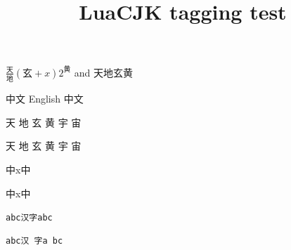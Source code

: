 \documentclass{article}
\title{LuaCJK tagging test}
\begin{document}
$\frac{天}{地}(玄+x)2^黄$ and 天地玄黄

中文 English 中文

天 地 玄 黄 宇 宙

{天 地 玄 黄 宇 宙}

中x中

中x中

\verb|abc汉字abc|

\begin{verbatim}
abc汉 字a bc
\end{verbatim}
\end{document}
